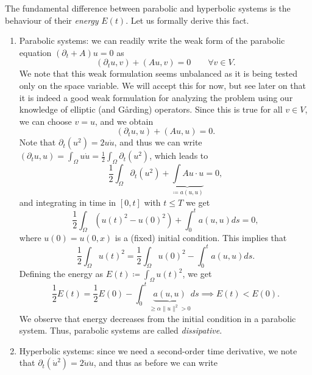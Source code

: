 The fundamental difference between parabolic and hyperbolic systems is the behaviour of their \emph{energy} $E(t)$. Let us formally derive this fact.
\begin{enumerate}
    \item Parabolic systems: we can readily write the weak form of the parabolic equation $(\partial_t + A)u=0$ as
    \begin{equation}
        (\partial_t u, v) + (Au, v) = 0 \qquad \forall v\in V.
    \end{equation}
    We note that this weak formulation seems unbalanced as it is being tested only on the space variable. We will accept this for now, but see later on that it is indeed a good weak formulation for analyzing the problem using our knowledge of elliptic (and Gårding) operators. Since this is true for all $v\in V$, we can choose $v=u$, and we obtain
    \begin{equation}
        (\partial_t u, u) + (Au,u) = 0.
    \end{equation}
    Note that $\partial_t(u^2) = 2u\dot{u}$, and thus we can write $(\partial_t u, u) = \int_\Omega u\dot{u} = \frac{1}{2}\int_\Omega \partial_t (u^2)$, which leads to
    \begin{equation}
        \frac{1}{2}\int_\Omega \partial_t (u^2) + \underbrace{\int Au \cdot u}_{ \coloneqq  a(u,u)} = 0, 
    \end{equation}
    and integrating in time in $[0,t]$ with $t\leq T$ we get
    \begin{equation}
        \frac{1}{2} \int_\Omega (u(t)^2-u(0)^2)  + \int_0^t a(u,u)ds = 0,
    \end{equation}
    where $u(0) = u(0,x)$ is a (fixed) initial condition. This implies that
    \begin{equation}
        \frac{1}{2}\int_\Omega u(t)^2 =  \frac{1}{2} \int_\Omega u(0)^2 - \int_0^t a(u,u)ds.
    \end{equation}
    Defining the energy as $E(t) \coloneqq \int_\Omega u(t)^2$, we get
    \begin{equation}
        \frac{1}{2}E(t) = \frac{1}{2}E(0) - \int_0^t \underbrace{a(u,u)}_{\geq \alpha\|u\|^2>0} ds \implies \boxed{E(t) < E(0)}.
    \end{equation}
    We observe that energy decreases from the initial condition in a parabolic system. Thus, parabolic systems are called \emph{dissipative}.
    \item Hyperbolic systems: since we need a second-order time derivative, we note that $\partial_t(\dot{u}^2) = 2\dot{u}\ddot{u}$, and thus as before we can write

\end{enumerate}
